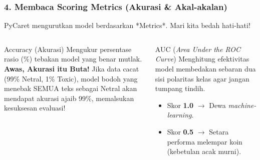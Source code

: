 \documentclass[t,aspectratio=169,xcolor=dvipsnames]{beamer}
\begin{document}
\begin{frame}
    \frametitle{4. Membaca Scoring Metrics (Akurasi \& Akal-akalan)}
    \scriptsize
    PyCaret mengurutkan model berdasarkan *Metrics*. Mari kita bedah hati-hati!
    \vspace{0.2cm}
    \begin{columns}[T]
        \begin{block}{Accuracy (Akurasi)}
            Mengukur persentase rasio (\%) tebakan model yang benar mutlak.\\
            \vspace{0.2cm}
            \textbf{Awas, Akurasi itu Buta!} Jika data cacat (99\% Netral, 1\% Toxic), model bodoh yang menebak SEMUA teks sebagai Netral akan mendapat akurasi ajaib 99\%, memalsukan kesuksesan evaluasi!
        \end{block}

        \begin{block}{AUC (\textit{Area Under the ROC Curve})}
            Menghitung efektivitas model membedakan sebaran dua sisi polaritas kelas agar jangan tumpang tindih.\\
            \vspace{0.2cm}
            \begin{itemize}
                \item Skor \textbf{1.0} $\rightarrow$ Dewa \textit{machine-learning}.
                \item Skor \textbf{0.5} $\rightarrow$ Setara performa melempar koin (kebetulan acak murni).
            \end{itemize}
        \end{block}
    \end{columns}
\end{frame}
\end{document}

